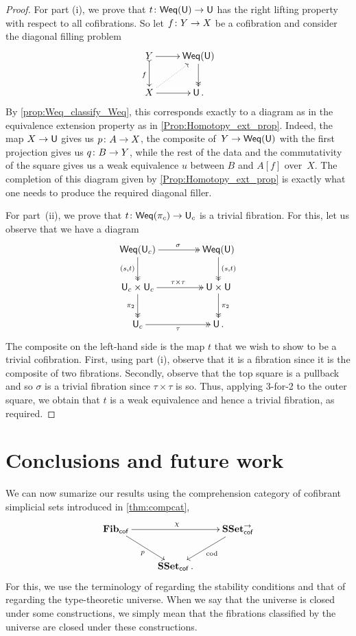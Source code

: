 \documentclass[reqno,10pt,a4paper,oneside,draft]{amsart}
\begin{document}
\begin{proof} For part (i), we prove that $t \colon  \mathsf{Weq}(\mathsf{U}) \to \mathsf{U}$ has the right lifting property with respect
to all cofibrations. So let $f \colon Y \rightarrow X$ be a cofibration and consider the diagonal
filling problem
\[
\xymatrix{Y \ar@{>->}[d]_f \ar[r] & \mathsf{Weq}(\U) \ar@{->>}[d] \\
X \ar[r] \ar@{.>}[ur]  & \U \, .
}
\]
By  \cref{prop:Weq_classify_Weq}, this corresponds exactly to a diagram as in the equivalence extension property as in \cref{Prop:Homotopy_ext_prop}. Indeed, the map $X \rightarrow \mathsf{U}$ gives us
$p \colon A \to X$, the composite of~$Y \rightarrow  \mathsf{Weq}(\mathsf{U})$ with the first projection
gives us $q \colon B \to Y$, while the rest of the data and the commutativity of the square 
gives us a weak equivalence $u$ between $B$ and $A[f]$ over~$X$. The completion of this diagram given by \cref{Prop:Homotopy_ext_prop} is exactly what one needs to produce the required diagonal filler.

For part~(ii), we prove that $t \colon \mathsf{Weq}(\pi_c) \to \mathsf{U}_c$ is a trivial fibration. For this, let us
observe that we have a diagram 
\[
\xymatrix@C=1.5cm{
\Weq(\U_c) \ar@{->>}[r]^{\sigma}  \ar@{->>}[d]_{(s,t)} & \Weq(\U) \ar@{->>}[d]^{(s,t)} \\
\U_c \times \U_c \ar@{->>}[r]^{\tau \times \tau} \ar@{->>}[d]_{\pi_2} & \U \times \U \ar@{->>}[d]^{\pi_2} \\
\U_c \ar@{->>}[r]_\tau & \U \, . }
\]
The composite  on the left-hand side is the map $t$ that we wish to show to be a trivial cofibration.
First, using part (i), observe that it is a fibration since it is the composite of two fibrations. Secondly,
observe that the top square is a pullback and so $\sigma$ is a trivial fibration since $\tau \times \tau$ 
is so. Thus, applying 3-for-2 to the outer square, we obtain that $t$ is a weak equivalence and hence
a trivial fibration, as required.
\end{proof} 


\section{Conclusions and future work}
\label{sec:conclusion}

We can now sumarize our results using the comprehension category of cofibrant simplicial sets introduced in \cref{thm:compcat}, 
\[ 
\xymatrix{
\mathbf{Fib}_{ \mathsf{cof}} \ar[dr]_{p} \ar[rr]^{\chi} & & \SSet^{\to}_{\mathsf{cof}} \ar[dl]^{\mathrm{cod}} \\ 
 & \SSet_{\mathsf{cof}} \, . &  }
 \]
For this, we use the terminology of \cite{LumsdaineP:locuoc} regarding the stability conditions and
that of  \cite[Appendix~A]{ShulmanM:allths}  regarding the type-theoretic universe. When we say
that the universe is closed under some constructions, we simply mean that the fibrations classified by the universe are closed under these constructions.
\end{document}

